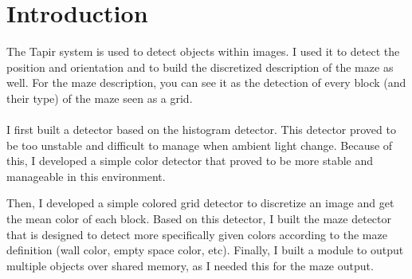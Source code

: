 \section{Introduction}

The Tapir system is used to detect objects within images. I used 
it to detect the \khepera{} position and orientation and to build the 
discretized description of the maze as well. For the maze description, 
you can see it as the detection of every block (and their type) of the 
maze seen as a grid.
\\
\\
I first built a detector based on the histogram detector. This detector 
proved to be too unstable and difficult to manage when ambient light 
change. Because of this, I developed a simple color detector that 
proved to be more stable and manageable in this environment. 

Then, I developed a simple colored grid detector to discretize an image 
and get the mean color of each block. Based on this detector, I built 
the maze detector that is designed to detect more specifically given 
colors according to the maze definition (wall color, empty space color, 
etc). Finally, I built a module to output multiple objects over shared 
memory, as I needed this for the maze output.
